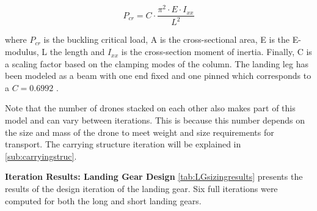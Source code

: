 



\begin{equation} \label{Eq:Eulerbuck}
    P_{cr} = C\cdot \frac{\pi^2 \cdot E \cdot I_{xx}}{L^2} 
\end{equation}

where $P_{cr}$ is the buckling critical load, A is the cross-sectional area, E is the E-modulus, L the length and $I_{xx}$ is the cross-section moment of inertia. Finally, C is a scaling factor based on the clamping modes of the column. The landing leg has been modeled as a beam with one end fixed and one pinned which corresponds to a $C = 0.6992$ \cite{SAD}.

Note that the number of drones stacked on each other also makes part of this model and can vary between iterations. This is because this number depends on the size and mass of the drone to meet weight and size requirements for transport. The carrying structure iteration will be explained in \autoref{sub:carryingstruc}. 


\textbf{Iteration Results: Landing Gear Design} \newline
\autoref{tab:LGsizingresults} presents the results of the design iteration of the landing gear. Six full iterations were computed for both the long and short landing gears.

